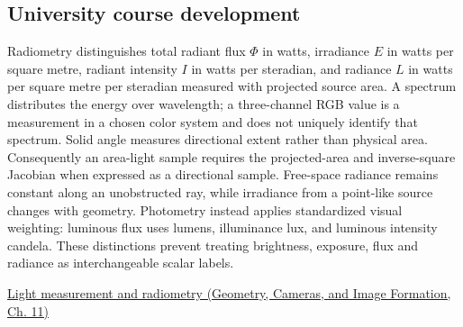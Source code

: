 \subsection{University course development}\label{appendix-215c2570199b-university-course-development}

Radiometry distinguishes total radiant flux \(\Phi\) in watts, irradiance \(E\) in watts per square metre, radiant intensity \(I\) in watts per steradian, and radiance \(L\) in watts per square metre per steradian measured with projected source area. A spectrum distributes the energy over wavelength; a three-channel RGB value is a measurement in a chosen color system and does not uniquely identify that spectrum. Solid angle measures directional extent rather than physical area. Consequently an area-light sample requires the projected-area and inverse-square Jacobian when expressed as a directional sample. Free-space radiance remains constant along an unobstructed ray, while irradiance from a point-like source changes with geometry. Photometry instead applies standardized visual weighting: luminous flux uses lumens, illuminance lux, and luminous intensity candela. These distinctions prevent treating brightness, exposure, flux and radiance as interchangeable scalar labels.

\href{../03-Geometry-Cameras-and-Image-Formation/main.pdf\#nameddest=03-visual-computing-i-ch004-light-measurement-and-radiometry}{Light measurement and radiometry (Geometry, Cameras, and Image Formation, Ch. 11)}
